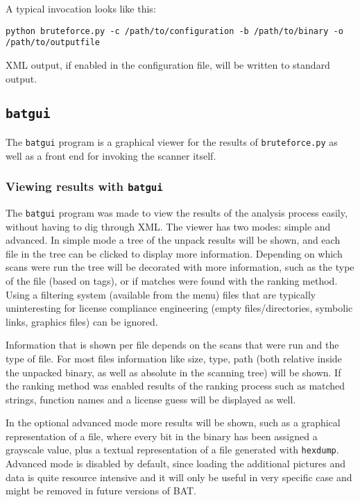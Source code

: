 \documentclass[10pt]{article}
\begin{document}
A typical invocation looks like this:

\texttt{python bruteforce.py -c /path/to/configuration -b /path/to/binary -o
/path/to/outputfile}

XML output, if enabled in the configuration file, will be written to standard
output.

\subsection{\texttt{batgui}}

The \texttt{batgui} program is a graphical viewer for the results of
\texttt{bruteforce.py} as well as a front end for invoking the scanner itself.

\subsubsection{Viewing results with \texttt{batgui}}

The \texttt{batgui} program was made to view the results of the analysis
process easily, without having to dig through XML. The viewer has two modes:
simple and advanced. In simple mode a tree of the unpack results will be shown,
and each file in the tree can be clicked to display more information. Depending
on which scans were run the tree will be decorated with more information, such
as the type of the file (based on tags), or if matches were found with the
ranking method. Using a filtering system (available from the menu) files that
are typically uninteresting for license compliance engineering (empty
files/directories, symbolic links, graphics files) can be ignored.

Information that is shown per file depends on the scans that were run and the
type of file. For most files information like size, type, path (both relative
inside the unpacked binary, as well as absolute in the scanning tree) will be
shown. If the ranking method was enabled results of the ranking process such as
matched strings, function names and a license guess will be displayed as well.

In the optional advanced mode more results will be shown, such as a graphical
representation of a file, where every bit in the binary has been assigned a
grayscale value, plus a textual representation of a file generated with
\texttt{hexdump}. Advanced mode is disabled by default, since loading the
additional pictures and data is quite resource intensive and it will only be
useful in very specific case and might be removed in future versions of BAT.
\end{document}
